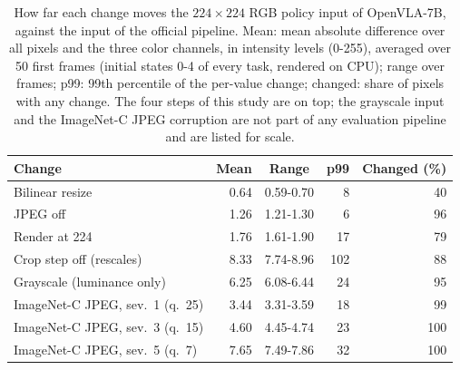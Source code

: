 \begin{table}[t]
\caption{How far each change moves the $224 \times 224$ RGB policy input of OpenVLA-7B, against the input of the official pipeline. Mean: mean absolute difference over all pixels and the three color channels, in intensity levels (0-255), averaged over 50 first frames (initial states 0-4 of every task, rendered on CPU); range over frames; p99: 99th percentile of the per-value change; changed: share of pixels with any change. The four steps of this study are on top; the grayscale input and the ImageNet-C JPEG corruption are not part of any evaluation pipeline and are listed for scale.}
\label{tab:eda}
\centering
\footnotesize
\setlength{\tabcolsep}{3.5pt}
\begin{tabular}{@{}lrcrr@{}}
\toprule
Change & Mean & Range & p99 & Changed (\%) \\
\midrule
Bilinear resize & 0.64 & 0.59-0.70 & 8 & 40 \\
JPEG off & 1.26 & 1.21-1.30 & 6 & 96 \\
Render at 224 & 1.76 & 1.61-1.90 & 17 & 79 \\
Crop step off (rescales) & 8.33 & 7.74-8.96 & 102 & 88 \\
\midrule
Grayscale (luminance only) & 6.25 & 6.08-6.44 & 24 & 95 \\
ImageNet-C JPEG, sev.~1 (q.~25) & 3.44 & 3.31-3.59 & 18 & 99 \\
ImageNet-C JPEG, sev.~3 (q.~15) & 4.60 & 4.45-4.74 & 23 & 100 \\
ImageNet-C JPEG, sev.~5 (q.~7) & 7.65 & 7.49-7.86 & 32 & 100 \\
\bottomrule
\end{tabular}
\end{table}
